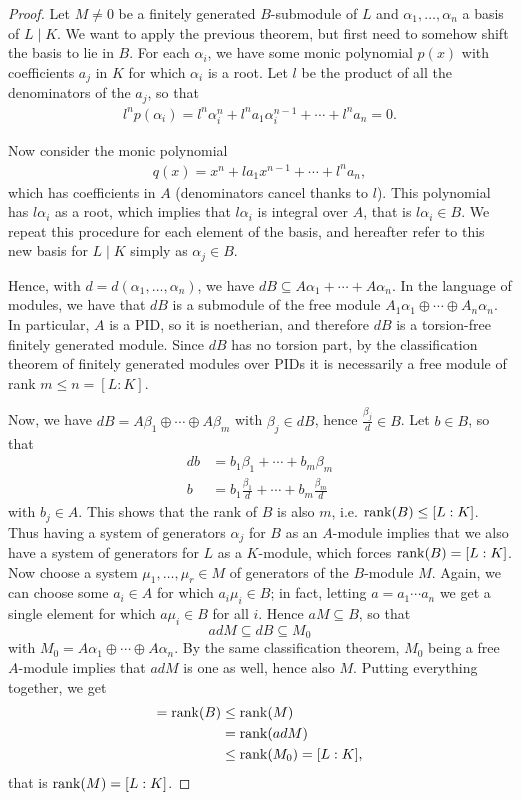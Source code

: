 \begin{proof}
	Let $M\neq 0$ be a finitely generated $B$-submodule of $L$ and $\alpha_1,\dots,\alpha_n$ a basis of $L\mid K$. We want to apply the previous theorem, but first need to somehow shift the basis to lie in $B$. For each $\alpha_i$, we have some monic polynomial $p(x)$ with coefficients $a_j$ in $K$ for which $\alpha_i$ is a root. Let $l$ be the product of all the denominators of the $a_j$, so that
	\begin{align*}
		l^n p(\alpha_i) = l^n \alpha_i^n + l^n a_1 \alpha_i^{n-1} + \cdots + l^n a_n = 0.
	\end{align*}

	Now consider the monic polynomial
	\begin{align*}
		q(x) = x^n + l a_1 x^{n-1} + \cdots + l^n a_n,
	\end{align*}
	which has coefficients in $A$ (denominators cancel thanks to $l$). This polynomial has $l\alpha_i$ as a root, which implies that $l\alpha_i$ is integral over $A$, that is $l\alpha_i\in B$. We repeat this procedure for each element of the basis, and hereafter refer to this new basis for $L\mid K$ simply as $\alpha_j\in B$.

	Hence, with $d=d(\alpha_1,\dots,\alpha_n)$, we have $dB\subseteq A\alpha_1+\cdots+A\alpha_n$. In the language of modules, we have that $dB$ is a submodule of the free module $A_1\alpha_1\oplus\cdots\oplus A_n\alpha_n$. In particular, $A$ is a PID, so it is noetherian, and therefore $dB$ is a torsion-free finitely generated module. Since $dB$ has no torsion part, by the classification theorem of finitely generated modules over PIDs it is necessarily a free module of rank $m \leq n = [L:K]$.

	 Now, we have $dB=A\beta_1\oplus\cdots\oplus A\beta_m$ with $\beta_j\in dB$, hence $\frac{\beta_j}{d}\in B$. Let $b\in B$, so that
	\begin{align*}
		db &= b_1\beta_1 + \cdots + b_m\beta_m\\
		b &= b_1\frac{\beta_1}{d} + \cdots + b_m\frac{\beta_m}{d}
	\end{align*}
	with $b_j\in A$. This shows that the rank of $B$ is also $m$, i.e. $\operatorname{rank}(B)\leq[L:K]$. Thus having a system of generators $\alpha_j$ for $B$ as an $A$-module implies that we also have a system of generators for $L$ as a $K$-module, which forces $\operatorname{rank}(B)=[L:K]$. Now choose a system $\mu_1,\dots,\mu_r\in M$ of generators of the $B$-module $M$. Again, we can choose some $a_i\in A$ for which $a_i\mu_i\in B$; in fact, letting $a=a_1\cdots a_n$ we get a single element for which $a\mu_i\in B$ for all $i$. Hence $aM\subseteq B$, so that
	\[
		adM \subseteq dB \subseteq M_0
	\]
	with $M_0=A\alpha_1\oplus\cdots\oplus A\alpha_n$. By the same classification theorem, $M_0$ being a free $A$-module implies that $adM$ is one as well, hence also $M$. Putting everything together, we get
	\begin{align*}
		[L:K] = \rank(B) &\leq \rank(M)\\
			&= \rank(adM)\\
			&\leq \rank(M_0) = [L:K],
	\end{align*}
	that is $\operatorname{rank}(M)=[L:K]$.
\end{proof}

